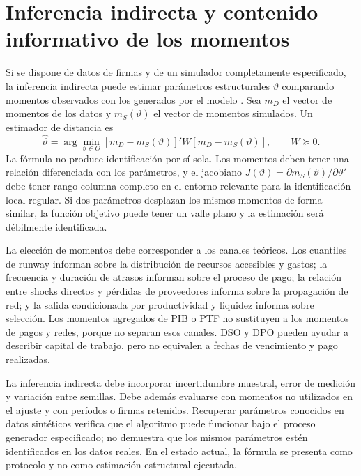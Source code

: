 \documentclass[11pt,a4paper]{article}
\begin{document}
\section{Inferencia indirecta y contenido informativo de los momentos}
Si se dispone de datos de firmas y de un simulador completamente especificado, la inferencia indirecta puede estimar parámetros estructurales $\vartheta$ comparando momentos observados con los generados por el modelo \citep{gourieroux1993}. Sea $m_D$ el vector de momentos de los datos y $m_S(\vartheta)$ el vector de momentos simulados. Un estimador de distancia es
\begin{equation}
\widehat\vartheta=\arg\min_{\vartheta\in\Theta}[m_D-m_S(\vartheta)]'W[m_D-m_S(\vartheta)],\qquad W\succeq0. \label{eq:indirect}
\end{equation}
La fórmula no produce identificación por sí sola. Los momentos deben tener una relación diferenciada con los parámetros, y el jacobiano $J(\vartheta)=\partial m_S(\vartheta)/\partial\vartheta'$ debe tener rango columna completo en el entorno relevante para la identificación local regular. Si dos parámetros desplazan los mismos momentos de forma similar, la función objetivo puede tener un valle plano y la estimación será débilmente identificada.

La elección de momentos debe corresponder a los canales teóricos. Los cuantiles de runway informan sobre la distribución de recursos accesibles y gastos; la frecuencia y duración de atrasos informan sobre el proceso de pago; la relación entre shocks directos y pérdidas de proveedores informa sobre la propagación de red; y la salida condicionada por productividad y liquidez informa sobre selección. Los momentos agregados de PIB o PTF no sustituyen a los momentos de pagos y redes, porque no separan esos canales. DSO y DPO pueden ayudar a describir capital de trabajo, pero no equivalen a fechas de vencimiento y pago realizadas.

La inferencia indirecta debe incorporar incertidumbre muestral, error de medición y variación entre semillas. Debe además evaluarse con momentos no utilizados en el ajuste y con períodos o firmas retenidos. Recuperar parámetros conocidos en datos sintéticos verifica que el algoritmo puede funcionar bajo el proceso generador especificado; no demuestra que los mismos parámetros estén identificados en los datos reales. En el estado actual, la fórmula se presenta como protocolo y no como estimación estructural ejecutada.
\end{document}
